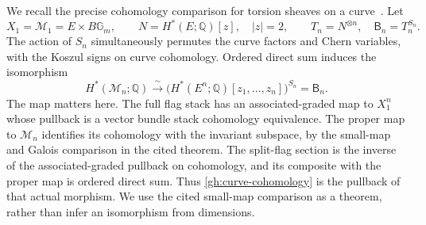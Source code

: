 We recall the precise cohomology comparison for torsion sheaves on a
curve~\cite[\S\S3.1--3.3]{JindalLim2026}. Let
\[
 X_1=\mathcal M_1=E\times B\mathbb G_m,\qquad
 N=H^*(E;\mathbb Q)[z],\quad |z|=2,\qquad
 T_n=N^{\otimes n},\quad
 \mathsf B_n=T_n^{S_n}.
\]
The action of $S_n$ simultaneously permutes the curve factors and
Chern variables, with the Koszul signs on curve cohomology.
Ordered direct sum induces the isomorphism
\begin{equation}\label{gh:curve-cohomology}
 H^*(\mathcal M_n;\mathbb Q)
    \xrightarrow{\ \sim\ }
 \bigl(H^*(E^n;\mathbb Q)[z_1,\ldots,z_n]\bigr)^{S_n}
 =\mathsf B_n.
\end{equation}
The map matters here. The full flag stack has an associated-graded
map to $X_1^n$ whose pullback is a vector bundle stack cohomology
equivalence. The proper map to $\mathcal M_n$ identifies its
cohomology with the invariant subspace, by the small-map and Galois
comparison in the cited theorem. The split-flag section is the inverse
of the associated-graded pullback on cohomology, and its composite
with the proper map is ordered direct sum. Thus
\eqref{gh:curve-cohomology} is the pullback of that actual morphism.
We use the cited small-map comparison as a theorem, rather than
infer an isomorphism from dimensions.

